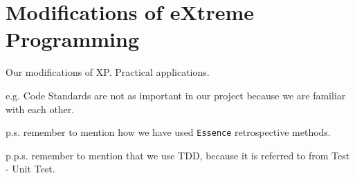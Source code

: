 \section{Modifications of eXtreme Programming}
Our modifications of XP.
Practical applications.

e.g. Code Standards are not as important in our project because we are familiar with each other.


p.s. remember to mention how we have used \texttt{Essence} retrospective methods.

p.p.s. remember to mention that we use TDD, because it is referred to from Test - Unit Test.